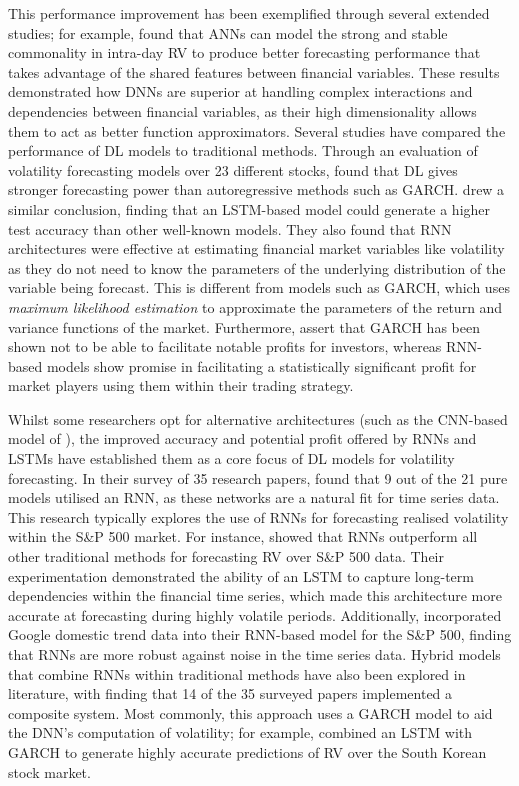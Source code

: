\documentclass[a4paper, 11pt]{report}
\begin{document}
    
    
    This performance improvement has been exemplified through several extended studies; for example, \citet{zhang-2022} found that ANNs can model the strong and stable commonality in intra-day RV to produce better forecasting performance that takes advantage of the shared features between financial variables. These results demonstrated how DNNs are superior at handling complex interactions and dependencies between financial variables, as their high dimensionality allows them to act as better function approximators. Several studies have compared the performance of DL models to traditional methods. Through an evaluation of volatility forecasting models over 23 different stocks, \citet{rahimikia-2020} found that DL gives stronger forecasting power than autoregressive methods such as GARCH. \citet{rodikov-2022} drew a similar conclusion, finding that an LSTM-based model could generate a higher test accuracy than other well-known models. They also found that RNN architectures were effective at estimating financial market variables like volatility as they do not need to know the parameters of the underlying distribution of the variable being forecast. This is different from models such as GARCH, which uses \emph{maximum likelihood estimation} to approximate the parameters of the return and variance functions of the market. Furthermore, \citet{tino-2001} assert that GARCH has been shown not to be able to facilitate notable profits for investors, whereas RNN-based models show promise in facilitating a statistically significant profit for market players using them within their trading strategy. 

    Whilst some researchers opt for alternative architectures (such as the CNN-based model of \citet{chen-2018}), the improved accuracy and potential profit offered by RNNs and LSTMs have established them as a core focus of DL models for volatility forecasting. In their survey of 35 research papers, \citet{ge-2022} found that 9 out of the 21 pure models utilised an RNN, as these networks are a natural fit for time series data. This research typically explores the use of RNNs for forecasting realised volatility within the S\&P 500 market. For instance, \citet{bucci-2020} showed that RNNs outperform all other traditional methods for forecasting RV over S\&P 500 data. Their experimentation demonstrated the ability of an LSTM to capture long-term dependencies within the financial time series, which made this architecture more accurate at forecasting during highly volatile periods. Additionally, \citet{xiong-2016} incorporated Google domestic trend data into their RNN-based model for the S\&P 500, finding that RNNs are more robust against noise in the time series data. Hybrid models that combine RNNs within traditional methods have also been explored in literature, with \citet{ge-2022} finding that 14 of the 35 surveyed papers implemented a composite system. Most commonly, this approach uses a GARCH model to aid the DNN's computation of volatility; for example, \citet{kim-2018} combined an LSTM with GARCH to generate highly accurate predictions of RV over the South Korean stock market.
\end{document}

